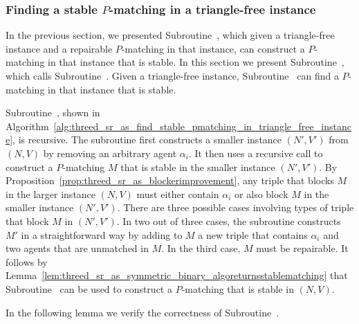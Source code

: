 \subsubsection{Finding a stable \texorpdfstring{$P$}{P}-matching in a triangle-free instance}
\label{sec:threed_sr_as_symmetric_binary_finding_in_triangle_free}

In the previous section, we presented Subroutine~, which given a triangle-free instance and a repairable $P$\nobreakdash-matching in that instance, can construct a $P$\nobreakdash-matching in that instance that is stable. In this section we present Subroutine~, which calls Subroutine~. Given a triangle-free instance, Subroutine~ can find a $P$\nobreakdash-matching in that instance that is stable. 

Subroutine~, shown in Algorithm~\ref{alg:threed_sr_as_find_stable_pmatching_in_triangle_free_instance}, is recursive. The subroutine first constructs a smaller instance $(N', V')$ from $(N, V)$ by removing an arbitrary agent $\alpha_i$. It then uses a recursive call to construct a $P$\nobreakdash-matching $M$ that is stable in the smaller instance $(N', V')$. By Proposition~\ref{prop:threed_sr_as_blockerimprovement}, any triple that blocks $M$ in the larger instance $(N, V)$ must either contain $\alpha_i$ or also block $M$ in the smaller instance $(N', V')$. There are three possible cases involving types of triple that block $M$ in $(N', V')$. In two out of three cases, the subroutine constructs $M'$ in a straightforward way by adding to $M$ a new triple that contains $\alpha_i$ and two agents that are unmatched in $M$. In the third case, $M$ must be repairable. It follows by Lemma~\ref{lem:threed_sr_as_symmetric_binary_algoreturnsstablematching} that Subroutine~ can be used to construct a $P$\nobreakdash-matching that is stable in $(N, V)$.



In the following lemma we verify the correctness of Subroutine~.

